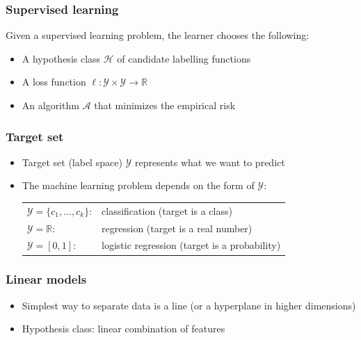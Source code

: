 \documentclass[10pt]{beamer}
\begin{document}
\begin{frame}
  \frametitle{Supervised learning}
  Given a supervised learning problem, the learner chooses the following:
  \begin{itemize}
	\item A hypothesis class $\mathcal{H}$ of candidate labelling functions
	\item A loss function $\ell:\mathcal{Y}\times\mathcal{Y}\rightarrow \mathbb{R}$
	\item An algorithm $\mathcal{A}$ that minimizes the empirical risk
  \end{itemize}
\end{frame}

\begin{frame}
  \frametitle{Target set}
  \begin{itemize}
	\item Target set (label space) $\mathcal{Y}$ represents what we want to {\color{blue} predict}
	\item The machine learning problem depends on the form of $\mathcal{Y}$:\\

	\vspace*{0.3cm}

	\begin{tabular}{ll}
		$\mathcal{Y}=\{c_1,\ldots,c_k\}$: & {\color{red} classification} (target is a class)\\
		$\mathcal{Y}=\mathbb{R}$: & {\color{red} regression} (target is a real number)\\
		$\mathcal{Y}=[0,1]$: & {\color{red} logistic regression} (target is a probability)
	\end{tabular}
  \end{itemize}
\end{frame}

\begin{frame}
  \frametitle{Linear models}
  \begin{itemize}
	\item Simplest way to separate data is a {\color{red} line} (or a {\color{red} hyperplane} in higher dimensions)
	\item Hypothesis class: linear combination of features
  \end{itemize}
\end{frame}
\end{document}
